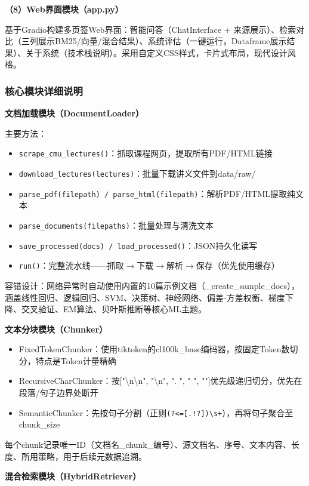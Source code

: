\documentclass[10pt,a4paper]{article}
\begin{document}
\textbf{（8）Web界面模块（app.py）}

基于Gradio构建多页签Web界面：智能问答（ChatInterface + 来源展示）、检索对比（三列展示BM25/向量/混合结果）、系统评估（一键运行，Dataframe展示结果）、关于系统（技术栈说明）。采用自定义CSS样式，卡片式布局，现代设计风格。

\subsubsection{核心模块详细说明}

\noindent\textbf{文档加载模块（DocumentLoader）}

主要方法：
\begin{itemize}
\item \texttt{scrape\_cmu\_lectures()}：抓取课程网页，提取所有PDF/HTML链接
\item \texttt{download\_lectures(lectures)}：批量下载讲义文件到data/raw/
\item \texttt{parse\_pdf(filepath) / parse\_html(filepath)}：解析PDF/HTML提取纯文本
\item \texttt{parse\_documents(filepaths)}：批量处理与清洗文本
\item \texttt{save\_processed(docs) / load\_processed()}：JSON持久化读写
\item \texttt{run()}：完整流水线——抓取$\to$下载$\to$解析$\to$保存（优先使用缓存）
\end{itemize}

容错设计：网络异常时自动使用内置的10篇示例文档（\_create\_sample\_docs），涵盖线性回归、逻辑回归、SVM、决策树、神经网络、偏差-方差权衡、梯度下降、交叉验证、EM算法、贝叶斯推断等核心ML主题。

\noindent\textbf{文本分块模块（Chunker）}

\begin{itemize}
\item FixedTokenChunker：使用tiktoken的cl100k\_base编码器，按固定Token数切分，特点是Token计量精确
\item RecursiveCharChunker：按["\textbackslash n\textbackslash n", "\textbackslash n", ". ", " ", ""]优先级递归切分，优先在段落/句子边界处断开
\item SemanticChunker：先按句子分割（正则\texttt{(?<=[.!?])\textbackslash s+}），再将句子聚合至chunk\_size
\end{itemize}

每个chunk记录唯一ID（文档名\_chunk\_编号）、源文档名、序号、文本内容、长度、所用策略，用于后续元数据追溯。

\noindent\textbf{混合检索模块（HybridRetriever）}
\end{document}
